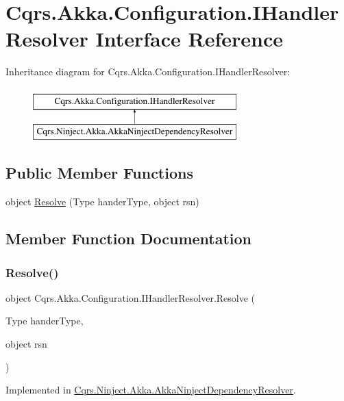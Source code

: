 \hypertarget{interfaceCqrs_1_1Akka_1_1Configuration_1_1IHandlerResolver}{}\section{Cqrs.\+Akka.\+Configuration.\+I\+Handler\+Resolver Interface Reference}
\label{interfaceCqrs_1_1Akka_1_1Configuration_1_1IHandlerResolver}
Inheritance diagram for Cqrs.\+Akka.\+Configuration.\+I\+Handler\+Resolver\+:\begin{figure}[H]
\begin{center}
\leavevmode
\includegraphics[height=2.000000cm]{interfaceCqrs_1_1Akka_1_1Configuration_1_1IHandlerResolver}
\end{center}
\end{figure}
\subsection*{Public Member Functions}
\begin{DoxyCompactItemize}
\item 
object \hyperlink{interfaceCqrs_1_1Akka_1_1Configuration_1_1IHandlerResolver_abae10eed2d92eb3f2831c5eba7e3c2d3_abae10eed2d92eb3f2831c5eba7e3c2d3}{Resolve} (Type hander\+Type, object rsn)
\end{DoxyCompactItemize}


\subsection{Member Function Documentation}
\mbox{\label{interfaceCqrs_1_1Akka_1_1Configuration_1_1IHandlerResolver_abae10eed2d92eb3f2831c5eba7e3c2d3_abae10eed2d92eb3f2831c5eba7e3c2d3}} 
\subsubsection{\texorpdfstring{Resolve()}{Resolve()}}
{\footnotesize\ttfamily object Cqrs.\+Akka.\+Configuration.\+I\+Handler\+Resolver.\+Resolve (\begin{DoxyParamCaption}\item[{Type}]{hander\+Type,  }\item[{object}]{rsn }\end{DoxyParamCaption})}



Implemented in \hyperlink{classCqrs_1_1Ninject_1_1Akka_1_1AkkaNinjectDependencyResolver_ab860d9bcf44b62098a8df91bbcb5013d_ab860d9bcf44b62098a8df91bbcb5013d}{Cqrs.\+Ninject.\+Akka.\+Akka\+Ninject\+Dependency\+Resolver}.


